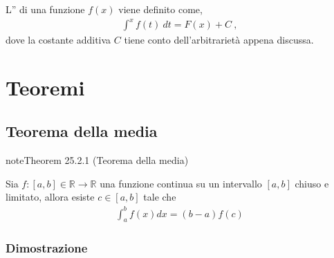 \documentclass[letterpaper,10pt,italian]{jupyterBook}
\begin{document}
\sphinxAtStartPar
L” di una funzione \(f(x)\) viene definito come,
\begin{equation*}
\begin{split}\int^x f(t) \ dt = F(x) + C \ ,\end{split}
\end{equation*}
\sphinxAtStartPar
dove la costante additiva \(C\) tiene conto dell’arbitrarietà appena discussa.


\section{Teoremi}
\label{\detokenize{ch/infinitesimal_calculus/integrals:teoremi}}\label{\detokenize{ch/infinitesimal_calculus/integrals:infinitesimal-calculus-integrals-thm}}



\subsection{Teorema della media}
\label{\detokenize{ch/infinitesimal_calculus/integrals:teorema-della-media}}\label{\detokenize{ch/infinitesimal_calculus/integrals:infinitesimal-calculus-integrals-thm-avg}}\label{ch/infinitesimal_calculus/integrals:integrals:thm:avg}
\begin{sphinxadmonition}{note}{Theorem 25.2.1 (Teorema della media)}



\sphinxAtStartPar
Sia \(f: [a,b] \in \mathbb{R} \rightarrow \mathbb{R}\) una funzione continua su un intervallo \([a,b]\) chiuso e limitato, allora esiste \(c \in [a,b]\) tale che
\begin{equation*}
\begin{split}\int_{a}^{b} f(x) dx = (b-a) f(c) \end{split}
\end{equation*}\end{sphinxadmonition}
\subsubsection*{Dimostrazione}
\end{document}
